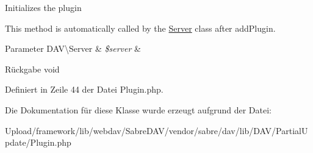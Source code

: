 Initializes the plugin

This method is automatically called by the \mbox{\hyperlink{class_sabre_1_1_d_a_v_1_1_server}{Server}} class after add\+Plugin.


\begin{DoxyParams}[1]{Parameter}
D\+A\+V\textbackslash{}\+Server & {\em \$server} & \\
\hline
\end{DoxyParams}
\begin{DoxyReturn}{Rückgabe}
void 
\end{DoxyReturn}


Definiert in Zeile 44 der Datei Plugin.\+php.



Die Dokumentation für diese Klasse wurde erzeugt aufgrund der Datei\+:\begin{DoxyCompactItemize}
\item 
Upload/framework/lib/webdav/\+Sabre\+D\+A\+V/vendor/sabre/dav/lib/\+D\+A\+V/\+Partial\+Update/Plugin.\+php\end{DoxyCompactItemize}
